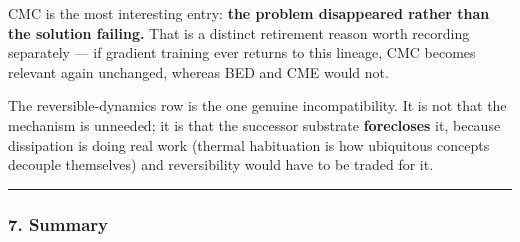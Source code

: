 \documentclass[
  11pt,
  a4paper,
]{article}
\begin{document}
CMC is the most interesting entry: \textbf{the problem disappeared
rather than the solution failing.} That is a distinct retirement reason
worth recording separately --- if gradient training ever returns to this
lineage, CMC becomes relevant again unchanged, whereas BED and CME would
not.

The reversible-dynamics row is the one genuine incompatibility. It is
not that the mechanism is unneeded; it is that the successor substrate
\textbf{forecloses} it, because dissipation is doing real work (thermal
habituation is how ubiquitous concepts decouple themselves) and
reversibility would have to be traded for it.

\begin{center}\rule{0.5\linewidth}{0.5pt}\end{center}

\subsubsection{7. Summary}\label{summary}
\end{document}
